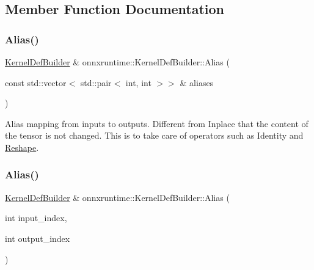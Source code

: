\subsection{Member Function Documentation}
\mbox{\label{classonnxruntime_1_1KernelDefBuilder_a31fc080c50bd8322e3b2ff8d7d82c021}} 
\subsubsection{\texorpdfstring{Alias()}{Alias()}\hspace{0.1cm}{\footnotesize\ttfamily [1/2]}}
{\footnotesize\ttfamily \mbox{\hyperlink{classonnxruntime_1_1KernelDefBuilder}{Kernel\+Def\+Builder}} \& onnxruntime\+::\+Kernel\+Def\+Builder\+::\+Alias (\begin{DoxyParamCaption}\item[{const std\+::vector$<$ std\+::pair$<$ int, int $>$$>$ \&}]{aliases }\end{DoxyParamCaption})}

Alias mapping from inputs to outputs. Different from Inplace that the content of the tensor is not changed. This is to take care of operators such as Identity and \mbox{\hyperlink{classonnxruntime_1_1Reshape}{Reshape}}. \mbox{\label{classonnxruntime_1_1KernelDefBuilder_ac4e3575d501ae43c4095bf41b34bdb4e}} 
\subsubsection{\texorpdfstring{Alias()}{Alias()}\hspace{0.1cm}{\footnotesize\ttfamily [2/2]}}
{\footnotesize\ttfamily \mbox{\hyperlink{classonnxruntime_1_1KernelDefBuilder}{Kernel\+Def\+Builder}} \& onnxruntime\+::\+Kernel\+Def\+Builder\+::\+Alias (\begin{DoxyParamCaption}\item[{int}]{input\+\_\+index,  }\item[{int}]{output\+\_\+index }\end{DoxyParamCaption})}

